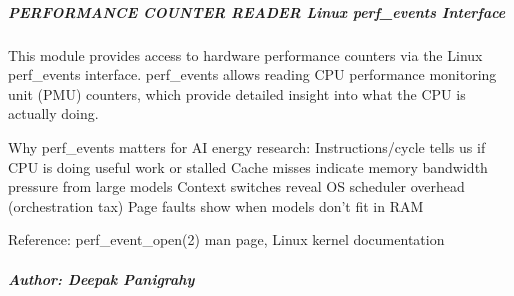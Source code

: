 \documentclass[letterpaper,10pt,english]{sphinxmanual}
\begin{document}
\subparagraph{PERFORMANCE COUNTER READER \sphinxhyphen{} Linux perf\_events Interface}
\label{\detokenize{core.readers.perf_reader:performance-counter-reader-linux-perf-events-interface}}
\sphinxAtStartPar
This module provides access to hardware performance counters via the Linux
perf\_events interface. perf\_events allows reading CPU performance monitoring
unit (PMU) counters, which provide detailed insight into what the CPU is
actually doing.

\sphinxAtStartPar
Why perf\_events matters for AI energy research:
\sphinxhyphen{} Instructions/cycle tells us if CPU is doing useful work or stalled
\sphinxhyphen{} Cache misses indicate memory bandwidth pressure from large models
\sphinxhyphen{} Context switches reveal OS scheduler overhead (orchestration tax)
\sphinxhyphen{} Page faults show when models don’t fit in RAM

\sphinxAtStartPar
Reference: perf\_event\_open(2) man page, Linux kernel documentation


\subparagraph{Author: Deepak Panigrahy}
\label{\detokenize{core.readers.perf_reader:author-deepak-panigrahy}}
\end{document}
